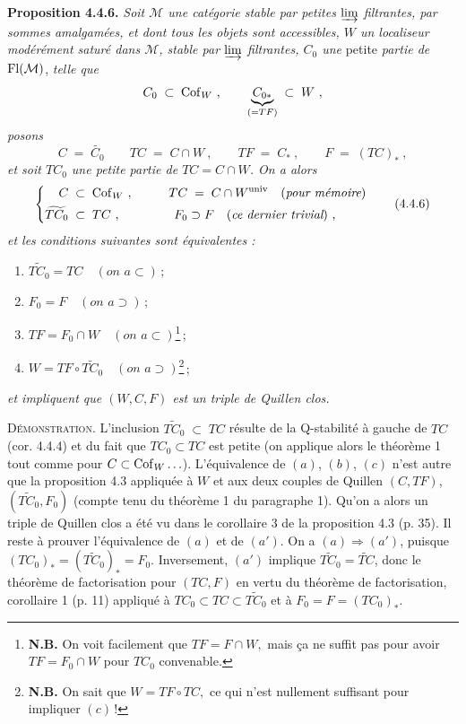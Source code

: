 \textbf{Proposition 4.4.6.} \textit{Soit $\mathcal{M}$ une catégorie stable par petites $\varinjlim$ filtrantes, par sommes amalgamées, et dont tous les objets sont accessibles, $W$ un localiseur}
\textit{modérément saturé dans $\mathcal{M}$, stable par $\varinjlim$ filtrantes, $C_0$ une} petite \textit{partie de} $\mathrm{Fl}(\mathcal{M})$, \textit{telle que}
\[
C_0\;\subset\;\mathrm{Cof}_W\ ,\qquad \underbrace{C_{0*}}_{(=TF)}\;\subset\;W\ ,
\]
\textit{posons}
\[
C\;=\;\widetilde{C_0}\qquad TC\;=\;C\cap W\ ,\qquad TF\;=\;C_*\ ,\qquad F\;=\;(TC)_*\ ,
\]
\textit{et soit $TC_0$ une petite partie de $TC=C\cap W$. On a alors}
\[
\left\{
\begin{aligned}
C &\;\subset\;\mathrm{Cof}_W\ , &\qquad TC &\;=\;C\cap W^{\mathrm{univ}}\quad(\textit{pour mémoire})\\
\widetilde{TC_0} &\;\subset\;TC\ , & F_0 &\supset F\quad(\textit{ce dernier trivial})\ ,
\end{aligned}
\right.
\tag*{(4.4.6)}
\]
\textit{et les conditions suivantes sont équivalentes :}
\begin{enumerate}[leftmargin=*]
\item[a)] $\widetilde{TC_0}=TC\quad(\textit{on a}\subset)$\,;
\item[a$'$)] $F_0=F\quad(\textit{on a}\supset)$\,;
\item[b)] $TF=F_0\cap W\quad(\textit{on a}\subset)$\footnote[14]{\textbf{N.B.} On voit facilement que $\boxed{TF=F\cap W,}$ mais ça ne suffit pas pour avoir $TF=F_0\cap W$ pour $TC_0$ convenable.}\,;
\item[c)] $W=TF\circ\widetilde{TC_0}\quad(\textit{on a}\supset)$\footnote[15]{\textbf{N.B.} On sait que $\boxed{W=TF\circ TC,}$ ce qui n'est nullement suffisant pour impliquer $(c)$\,!}\,;
\end{enumerate}
\textit{et impliquent que $(W,C,F)$ est un triple de Quillen clos.}

\textsc{Démonstration.} L'inclusion $\widetilde{TC_0}\;\subset\;TC$ résulte de la Q-stabilité à gauche de $TC$ (cor. 4.4.4) et du fait que $TC_0\subset TC$ est petite (on applique alors le théorème 1 tout comme pour $C\subset\mathrm{Cof}_W\ldots$). L'équivalence de $(a)$, $(b)$, $(c)$ n'est autre que la proposition 4.3 appliquée à $W$ et aux deux couples de Quillen $(C,TF)$, $(\widetilde{TC_0},F_0)$ (compte tenu du théorème 1 du paragraphe 1). Qu'on a alors un triple de Quillen clos a été vu dans le corollaire 3 de la proposition 4.3 (p. 35). Il reste à prouver l'équivalence de $(a)$ et de $(a')$. On a $(a)\Longrightarrow(a')$, puisque $(TC_0)_*=(\widetilde{TC_0})_*=F_0$. Inversement, $(a')$ implique $\widetilde{TC_0}=\widetilde{TC}$, donc le théorème de factorisation pour $(TC,F)$ en vertu du théorème de factorisation, corollaire 1 (p. 11) appliqué à $TC_0\subset TC\subset\widetilde{TC_0}$ et à $F_0=F=(TC_0)_*$.


